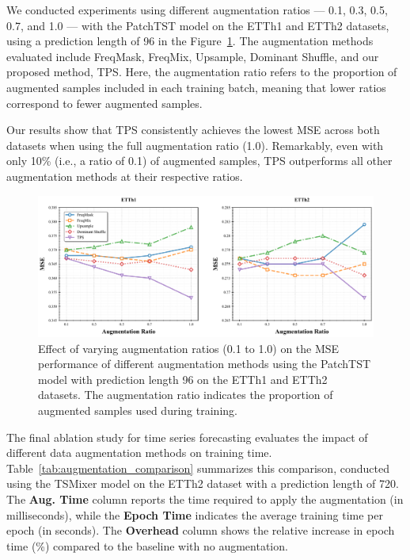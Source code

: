 We conducted experiments using different augmentation ratios — 0.1, 0.3, 0.5, 0.7, and 1.0 — with the PatchTST model on the ETTh1 and ETTh2 datasets, using a prediction length of 96 in the Figure~\ref{fig:augratio}. The augmentation methods evaluated include FreqMask, FreqMix, Upsample, Dominant Shuffle, and our proposed method, TPS. Here, the augmentation ratio refers to the proportion of augmented samples included in each training batch, meaning that lower ratios correspond to fewer augmented samples.

Our results show that TPS consistently achieves the lowest MSE across both datasets when using the full augmentation ratio (1.0). Remarkably, even with only 10\% (i.e., a ratio of 0.1) of augmented samples, TPS outperforms all other augmentation methods at their respective ratios.

\begin{figure}[h!]
    \centering
\includegraphics[page=1, width=1.0\textwidth, keepaspectratio]{./images/augmentation_ratio_analysis.pdf}
\caption{Effect of varying augmentation ratios (0.1 to 1.0) on the MSE performance of different augmentation methods using the PatchTST model with prediction length 96 on the ETTh1 and ETTh2 datasets. The augmentation ratio indicates the proportion of augmented samples used during training.}
    \label{fig:augratio}
\end{figure}



The final ablation study for time series forecasting evaluates the impact of different data augmentation methods on training time. Table~\ref{tab:augmentation_comparison} summarizes this comparison, conducted using the TSMixer model on the ETTh2 dataset with a prediction length of 720. The \textbf{Aug. Time} column reports the time required to apply the augmentation (in milliseconds), while the \textbf{Epoch Time} indicates the average training time per epoch (in seconds). The \textbf{Overhead} column shows the relative increase in epoch time (\%) compared to the baseline with no augmentation.

